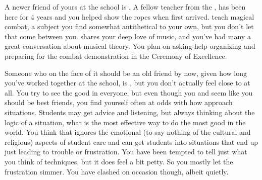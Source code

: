 \documentclass[char]{GL2020}
\begin{document}
A newer friend of yours at the school is \cInterpol{\full}. A fellow teacher from the \pFarm{}, \cInterpol{} has been here for 4 years and you helped show \cInterpol{\them} the ropes when \cInterpol{\they} first arrived. \cInterpol{\They} teach\cInterpol{\verbes} magical combat, a subject you find somewhat antithetical to your own, but you don't let that come between you. \cInterpol{} shares your deep love of music, and you've had many a great conversation about musical theory. You plan on asking \cInterpol{\their} help organizing and preparing for the combat demonstration in the Ceremony of Excellence.

Someone who on the face of it should be an old friend by now, given how long you’ve worked together at the school, is \cEthics{}, but you don’t actually feel close to \cEthics{\them} at all. You try to see the good in everyone, but even though you and \cEthics{} seem like you should be best friends, you find yourself often at odds with how \cEthics{\they} approach\cEthics{\verbes} situations. Students may get advice and listening, but \cEthics{\theyare} always thinking about the logic of a situation, what is the most effective way to do the most good in the world. You think that \cEthics{} ignores the emotional (to say nothing of the cultural and religious) aspects of student care and can get students into situations that end up just leading to trouble or frustration. You have been tempted to tell \cEthics{\them} just what you think of \cEthics{\their} techniques, but it does feel a bit petty. So you mostly let the frustration simmer. You have clashed on occasion though, albeit quietly.
\end{document}
